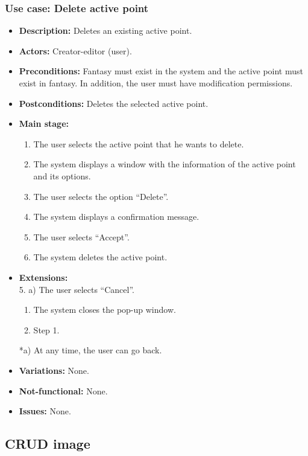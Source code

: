 \subsubsection{Use case: Delete active point}
\begin{itemize}
	\item \textbf{Description:} Deletes an existing active point.
	\item \textbf{Actors:} Creator-editor (user).
	\item \textbf{Preconditions:} Fantasy must exist in the system and the active point must exist in fantasy. In addition, the user must have modification permissions.
	\item \textbf{Postconditions:} Deletes the selected active point.
	\item \textbf{Main stage:}
	\begin{enumerate}
		\item The user selects the active point that he wants to delete.
		\item The system displays a window with the information of the active point and its options.
		\item The user selects the option ``Delete''.
		\item The system displays a confirmation message.
		\item The user selects ``Accept''.
		\item The system deletes the active point.
	\end{enumerate}
	\item \textbf{Extensions:} \\ 5. a) The user selects ``Cancel''.
	\begin{enumerate}
		\item The system closes the pop-up window.
		\item Step 1.
	\end{enumerate}
	*a) At any time, the user can go back.
	\item \textbf{Variations:} None.
	\item \textbf{Not-functional:} None.
	\item \textbf{Issues:} None.
\end{itemize}

\subsection{CRUD image}
\hypertarget{crearimagen}{}
